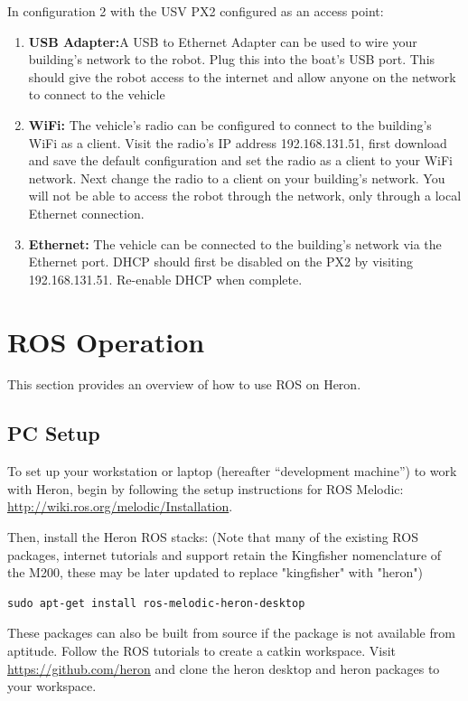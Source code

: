 \documentclass[]{clearpath-latex/clearpath-manual}
\begin{document}
In configuration 2 with the USV PX2 configured as an access point:

\begin{enumerate}
\item \textbf{USB Adapter:}A USB to Ethernet Adapter can be used to wire your building's network to the robot. Plug this into the boat's USB port. This should give the robot access to the internet and allow anyone on the network to connect to the vehicle
\item \textbf{WiFi:} The vehicle's radio can be configured to connect to the building's WiFi as a client. Visit the radio's IP address 192.168.131.51, first download and save the default configuration and set the radio as a client to your WiFi network. Next change the radio to a client on your building's network. You will not be able to access the robot through the network, only through a local Ethernet connection.
\item \textbf{Ethernet:} The vehicle can be connected to the building's network via the Ethernet port. DHCP should first be disabled on the PX2 by visiting 192.168.131.51. Re-enable DHCP when complete.
\end{enumerate}



\newpage

\section{ROS Operation}
This section provides an overview of how to use ROS on Heron.

\subsection{PC Setup} \label{pcsetup}

To set up your workstation or laptop (hereafter “development machine”) to work with Heron, begin by following the setup instructions for ROS Melodic: \url{http://wiki.ros.org/melodic/Installation}.

Then, install the Heron ROS stacks:
(Note that many of the existing ROS packages, internet tutorials and support retain the Kingfisher nomenclature of the M200, these may be later updated to replace "kingfisher" with "heron")

\begin{lstlisting}
sudo apt-get install ros-melodic-heron-desktop
\end{lstlisting}

These packages can also be built from source if the package is not available from aptitude. Follow the ROS tutorials to create a catkin workspace. Visit \url{https://github.com/heron} and clone the heron desktop and heron packages to your workspace.
\end{document}
